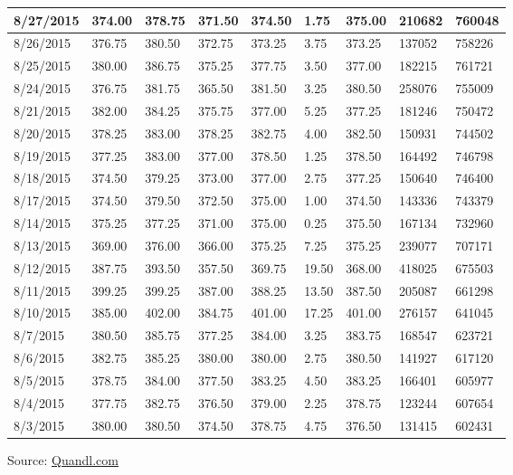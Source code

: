 \documentclass[]{book}
\theoremstyle{definition}
\theoremstyle{definition}
\theoremstyle{remark}
\begin{document}
\begin{tabular}{l|l|l|l|l|l|l|l|l}
\hline
8/27/2015 & 374.00 & 378.75 & 371.50 & 374.50 & 1.75 & 375.00 & 210682 & 760048\\
\hline
8/26/2015 & 376.75 & 380.50 & 372.75 & 373.25 & 3.75 & 373.25 & 137052 & 758226\\
\hline
8/25/2015 & 380.00 & 386.75 & 375.25 & 377.75 & 3.50 & 377.00 & 182215 & 761721\\
\hline
8/24/2015 & 376.75 & 381.75 & 365.50 & 381.50 & 3.25 & 380.50 & 258076 & 755009\\
\hline
8/21/2015 & 382.00 & 384.25 & 375.75 & 377.00 & 5.25 & 377.25 & 181246 & 750472\\
\hline
8/20/2015 & 378.25 & 383.00 & 378.25 & 382.75 & 4.00 & 382.50 & 150931 & 744502\\
\hline
8/19/2015 & 377.25 & 383.00 & 377.00 & 378.50 & 1.25 & 378.50 & 164492 & 746798\\
\hline
8/18/2015 & 374.50 & 379.25 & 373.00 & 377.00 & 2.75 & 377.25 & 150640 & 746400\\
\hline
8/17/2015 & 374.50 & 379.50 & 372.50 & 375.00 & 1.00 & 374.50 & 143336 & 743379\\
\hline
8/14/2015 & 375.25 & 377.25 & 371.00 & 375.00 & 0.25 & 375.50 & 167134 & 732960\\
\hline
8/13/2015 & 369.00 & 376.00 & 366.00 & 375.25 & 7.25 & 375.25 & 239077 & 707171\\
\hline
8/12/2015 & 387.75 & 393.50 & 357.50 & 369.75 & 19.50 & 368.00 & 418025 & 675503\\
\hline
8/11/2015 & 399.25 & 399.25 & 387.00 & 388.25 & 13.50 & 387.50 & 205087 & 661298\\
\hline
8/10/2015 & 385.00 & 402.00 & 384.75 & 401.00 & 17.25 & 401.00 & 276157 & 641045\\
\hline
8/7/2015 & 380.50 & 385.75 & 377.25 & 384.00 & 3.25 & 383.75 & 168547 & 623721\\
\hline
8/6/2015 & 382.75 & 385.25 & 380.00 & 380.00 & 2.75 & 380.50 & 141927 & 617120\\
\hline
8/5/2015 & 378.75 & 384.00 & 377.50 & 383.25 & 4.50 & 383.25 & 166401 & 605977\\
\hline
8/4/2015 & 377.75 & 382.75 & 376.50 & 379.00 & 2.25 & 378.75 & 123244 & 607654\\
\hline
8/3/2015 & 380.00 & 380.50 & 374.50 & 378.75 & 4.75 & 376.50 & 131415 & 602431\\
\hline
\end{tabular}

Source:
\href{https://www.quandl.com/data/CME/CZ2015-Corn-Futures-December-2015-CZ2015}{Quandl.com}
\end{document}
